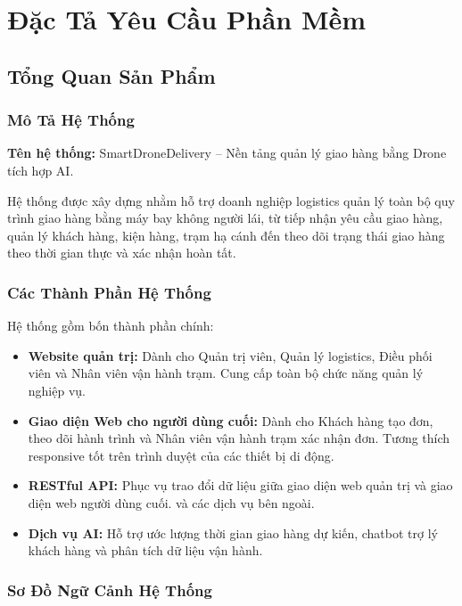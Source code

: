 \chapter{Đặc Tả Yêu Cầu Phần Mềm}

\section{Tổng Quan Sản Phẩm}

\subsection{Mô Tả Hệ Thống}

\textbf{Tên hệ thống:} SmartDroneDelivery -- Nền tảng quản lý giao hàng bằng Drone tích hợp AI.

Hệ thống được xây dựng nhằm hỗ trợ doanh nghiệp logistics quản lý toàn bộ quy trình giao hàng
bằng máy bay không người lái, từ tiếp nhận yêu cầu giao hàng, quản lý khách hàng, kiện
hàng, trạm hạ cánh đến theo dõi trạng thái giao hàng theo thời gian thực và xác nhận hoàn tất.

\subsection{Các Thành Phần Hệ Thống}

Hệ thống gồm bốn thành phần chính:

\begin{itemize}
  \item \textbf{Website quản trị:} Dành cho Quản trị viên, Quản lý logistics,
        Điều phối viên và Nhân viên vận hành trạm. Cung cấp toàn bộ chức năng quản lý nghiệp vụ.
  \item \textbf{Giao diện Web cho người dùng cuối:} Dành cho Khách hàng tạo đơn, theo dõi hành trình và Nhân viên vận hành trạm xác nhận đơn. Tương thích responsive tốt trên trình duyệt của các thiết bị di động.
  \item \textbf{RESTful API:} Phục vụ trao đổi dữ liệu giữa giao diện web quản trị và giao diện web người dùng cuối.
        và các dịch vụ bên ngoài.
  \item \textbf{Dịch vụ AI:} Hỗ trợ ước lượng thời gian giao hàng dự kiến, chatbot trợ lý khách
        hàng và phân tích dữ liệu vận hành.
\end{itemize}

\subsection{Sơ Đồ Ngữ Cảnh Hệ Thống}

